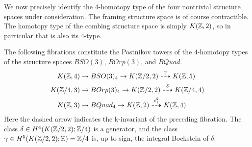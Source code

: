\documentclass{amsart}
\begin{document}
We now precisely identify the 4-homotopy type of the four nontrivial structure spaces under consideration.  The framing structure space is of course contractible.  The homotopy type of the combing structure space is simply $K(\mathbb Z,2)$, so in particular that is also its 4-type.

\begin{proposition}
The following fibrations constitute the Postnikov towers of the 4-homotopy types of the structure spaces $BSO(3)$, $BOrp(3)$, and $BQuad$.
\begin{align}
K(\mathbb Z,4) \rightarrow & \; BSO(3)_4 \rightarrow K(\mathbb Z/2,2) \overset{\gamma}{\dashrightarrow} K(\mathbb Z,5) \nonumber \\
K(\mathbb Z/4,3) \rightarrow & \; BOrp(3)_4 \rightarrow K(\mathbb Z/2,2) \overset{\delta}{\dashrightarrow} K(\mathbb Z/4,4) \nonumber \\
K(\mathbb Z,3) \rightarrow & \; BQuad_4 \rightarrow K(\mathbb Z,2) \overset{c_1^2}{\dashrightarrow} K(\mathbb Z,4) \nonumber
\end{align}
\nid Here the dashed arrow indicates the k-invariant of the preceding fibration.  The class $\delta \in H^4(K(\mathbb Z/2,2);\mathbb Z/4)$ is a generator, and the class $\gamma \in H^5(K(\mathbb Z/2,2);\mathbb Z) = \mathbb Z/4$ is, up to sign, the integral Bockstein of $\delta$. %
\end{proposition}
\end{document}

